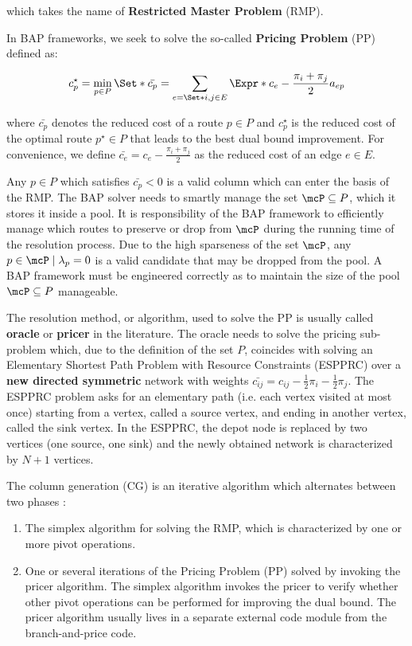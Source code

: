which takes the name of \textbf{Restricted Master Problem} (RMP).

In BAP frameworks, we seek to solve the so-called \textbf{Pricing Problem} (PP) defined as:

\begin{equation}
	{c^\star_p} = \min_{p \in P} \Set*{ \bar{c_p} = \sum_{e = \Set*{i, j} \in E} \Expr*{c_{e} - \frac{\pi_i + \pi_j}{2}} a_{ep}  }
\end{equation}

where $\bar{c_p}$ denotes the reduced cost of a route $p \in P$
and $c^\star_p$ is the reduced cost of the optimal route $p^\star \in P$
that leads to the best dual bound improvement.
For convenience,
we define $\bar{c_{e}} = c_{e} - \frac{\pi_i + \pi_j}{2}$
as the reduced cost of an edge $e\in E$.

Any $p \in P$ which satisfies $\bar{c_p} < 0$ is a valid column which can enter the basis of the RMP.
The BAP solver needs to smartly manage the set $\mcP \subseteq P$, which it stores it inside a pool.
It is responsibility of the BAP framework to efficiently manage which routes
to preserve or drop from $\mcP$ during the running time of the resolution process.
Due to the high sparseness of the set $\mcP$, any $p \in \mcP \mid \lambda_p = 0$
is a valid candidate that may be dropped from the pool.
A BAP framework must be engineered correctly as to maintain
the size of the pool $\mcP \subseteq P$ manageable.

\medskip

The resolution method, or algorithm,
used to solve the PP is usually called \textbf{oracle} or \textbf{pricer} in the literature.
The oracle needs to solve the pricing sub-problem which, due to the definition of the set $P$,
coincides with solving an Elementary Shortest Path Problem with Resource Constraints (ESPPRC)
over a \textbf{new directed symmetric} network with weights
$\bar{c_{ij}} = c_{ij} - \frac{1}{2} \pi_i - \frac{1}{2} \pi_j$.
The ESPPRC problem asks for an elementary path (i.e. each vertex visited at most once) starting
from a vertex, called a source vertex, and ending in another vertex, called the sink vertex.
In the ESPPRC, the depot node is replaced by two vertices (one source, one sink)
and the newly obtained network is characterized by $N + 1$ vertices.

\medskip

The column generation (CG) is an iterative algorithm which alternates between two phases \parencite{desaulniers2018}:
\begin{enumerate}
    \setlength{\itemsep}{0pt}
    \setlength{\parskip}{0pt}

	\item The simplex algorithm for solving the RMP, which is characterized by one or more pivot operations.
	\item One or several iterations of the Pricing Problem (PP) solved by invoking the pricer algorithm.
	      The simplex algorithm invokes the pricer to verify whether other pivot operations
	      can be performed for improving the dual bound.
	      The pricer algorithm usually lives in a separate external code module from the branch-and-price code.
\end{enumerate}

